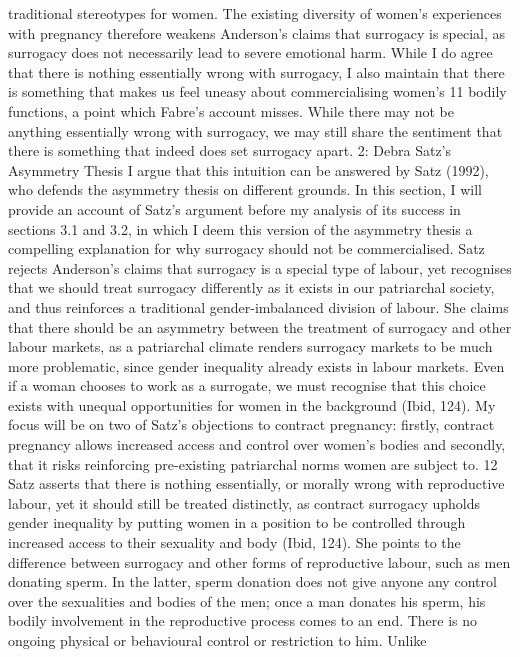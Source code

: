 traditional stereotypes for women. The existing diversity of women's
experiences with pregnancy therefore weakens Anderson's claims that
surrogacy is special, as surrogacy does not necessarily lead to severe
emotional harm. While I do agree that there is nothing essentially wrong
with surrogacy, I also maintain that there is something that makes us
feel uneasy about commercialising women's 11 bodily functions, a point
which Fabre's account misses. While there may not be anything
essentially wrong with surrogacy, we may still share the sentiment that
there is something that indeed does set surrogacy apart. 2: Debra Satz's
Asymmetry Thesis I argue that this intuition can be answered by Satz
(1992), who defends the asymmetry thesis on different grounds. In this
section, I will provide an account of Satz's argument before my analysis
of its success in sections 3.1 and 3.2, in which I deem this version of
the asymmetry thesis a compelling explanation for why surrogacy should
not be commercialised. Satz rejects Anderson's claims that surrogacy is
a special type of labour, yet recognises that we should treat surrogacy
differently as it exists in our patriarchal society, and thus reinforces
a traditional gender-imbalanced division of labour. She claims that
there should be an asymmetry between the treatment of surrogacy and
other labour markets, as a patriarchal climate renders surrogacy markets
to be much more problematic, since gender inequality already exists in
labour markets. Even if a woman chooses to work as a surrogate, we must
recognise that this choice exists with unequal opportunities for women
in the background (Ibid, 124). My focus will be on two of Satz's
objections to contract pregnancy: firstly, contract pregnancy allows
increased access and control over women's bodies and secondly, that it
risks reinforcing pre-existing patriarchal norms women are subject to.
12 Satz asserts that there is nothing essentially, or morally wrong with
reproductive labour, yet it should still be treated distinctly, as
contract surrogacy upholds gender inequality by putting women in a
position to be controlled through increased access to their sexuality
and body (Ibid, 124). She points to the difference between surrogacy and
other forms of reproductive labour, such as men donating sperm. In the
latter, sperm donation does not give anyone any control over the
sexualities and bodies of the men; once a man donates his sperm, his
bodily involvement in the reproductive process comes to an end. There is
no ongoing physical or behavioural control or restriction to him. Unlike
